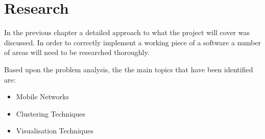 \chapter{Research}

In the previous chapter a detailed approach to what the project will cover was 
discussed. In order to correctly implement a working piece of a software a 
number of areas will need to be researched thoroughly.

Based upon the problem analysis, the the main topics that have been identified 
are:
\begin{itemize}
  \item Mobile Networks
  \item Clustering Techniques
  \item Visualisation Techniques
\end{itemize}

\newpage


\newpage


\newpage
